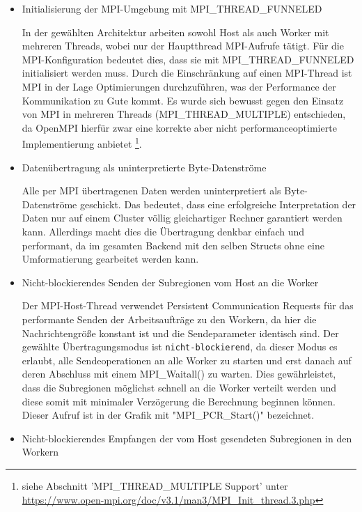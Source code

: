 \begin{itemize}
	
	\item \label{item:mpi_init} Initialisierung der MPI-Umgebung mit MPI\_THREAD\_FUNNELED
	
	In der gewählten Architektur arbeiten sowohl Host als auch Worker mit mehreren Threads, wobei nur der Hauptthread MPI-Aufrufe tätigt. Für die MPI-Konfiguration bedeutet dies, dass sie mit MPI\_THREAD\_FUNNELED initialisiert werden muss. Durch die Einschränkung auf einen MPI-Thread ist MPI in der Lage Optimierungen durchzuführen, was der Performance der Kommunikation zu Gute kommt. Es wurde sich bewusst gegen den Einsatz von MPI in mehreren Threads (MPI\_THREAD\_MULTIPLE) entschieden, da OpenMPI hierfür zwar eine korrekte aber nicht performanceoptimierte Implementierung anbietet \footnote{siehe Abschnitt 'MPI\_THREAD\_MULTIPLE Support' unter \url{https://www.open-mpi.org/doc/v3.1/man3/MPI_Init_thread.3.php}}.
	
	\item Datenübertragung als uninterpretierte Byte-Datenströme
	
	Alle per MPI übertragenen Daten werden uninterpretiert als Byte-Datenströme geschickt. Das bedeutet, dass eine erfolgreiche Interpretation der Daten nur auf einem Cluster völlig gleichartiger Rechner garantiert werden kann. Allerdings macht dies die Übertragung denkbar einfach und performant, da im gesamten Backend mit den selben Structs ohne eine Umformatierung gearbeitet werden kann.
	
	\item Nicht-blockierendes Senden der Subregionen vom Host an die Worker
	
	Der MPI-Host-Thread verwendet Persistent Communication Requests für das performante Senden der Arbeitsaufträge zu den Workern, da hier die Nachrichtengröße konstant ist und die Sendeparameter identisch sind. Der gewählte Übertragungsmodus ist \verb|nicht-blockierend|, da dieser Modus es erlaubt, alle Sendeoperationen an alle Worker zu starten und erst danach auf deren Abschluss mit einem MPI\_Waitall() zu warten. Dies gewährleistet, dass die Subregionen möglichst schnell an die Worker verteilt werden und diese somit mit minimaler Verzögerung die Berechnung beginnen können. Dieser Aufruf ist in der Grafik mit "MPI\_PCR\_Start()" bezeichnet.
	
	\item Nicht-blockierendes Empfangen der vom Host gesendeten Subregionen in den Workern
	

\end{itemize}

